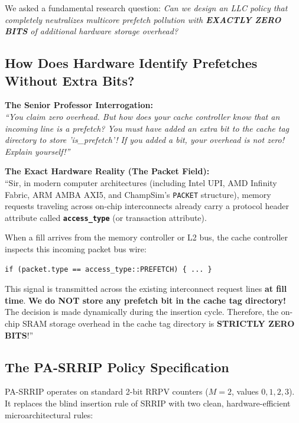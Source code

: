 \documentclass[11pt, a4paper]{article}
\begin{document}
\begin{calloutbox}[title=\textbf{Our Core Design Philosophy}]
We asked a fundamental research question: \textit{Can we design an LLC policy that completely neutralizes multicore prefetch pollution with \textbf{EXACTLY ZERO BITS} of additional hardware storage overhead?}
\end{calloutbox}

\subsection{How Does Hardware Identify Prefetches Without Extra Bits?}
\begin{trapbox}
\textbf{The Senior Professor Interrogation:}\\
\textit{``You claim zero overhead. But how does your cache controller know that an incoming line is a prefetch? You must have added an extra bit to the cache tag directory to store 'is\_prefetch'! If you added a bit, your overhead is not zero! Explain yourself!''}
\end{trapbox}

\begin{answerbox}
\textbf{The Exact Hardware Reality (The Packet Field):}\\
``Sir, in modern computer architectures (including Intel UPI, AMD Infinity Fabric, ARM AMBA AXI5, and ChampSim's \texttt{PACKET} structure), memory requests traveling across on-chip interconnects already carry a protocol header attribute called \textbf{\texttt{access\_type}} (or transaction attribute). 

When a fill arrives from the memory controller or L2 bus, the cache controller inspects this incoming packet bus wire:
\begin{verbatim}
if (packet.type == access_type::PREFETCH) { ... }
\end{verbatim}
This signal is transmitted across the existing interconnect request lines \textbf{at fill time}. \textbf{We do NOT store any prefetch bit in the cache tag directory!} The decision is made dynamically during the insertion cycle. Therefore, the on-chip SRAM storage overhead in the cache tag directory is \textbf{STRICTLY ZERO BITS}!''
\end{answerbox}

\subsection{The PA-SRRIP Policy Specification}
PA-SRRIP operates on standard 2-bit RRPV counters ($M=2$, values $0, 1, 2, 3$). It replaces the blind insertion rule of SRRIP with two clean, hardware-efficient microarchitectural rules:
\end{document}
